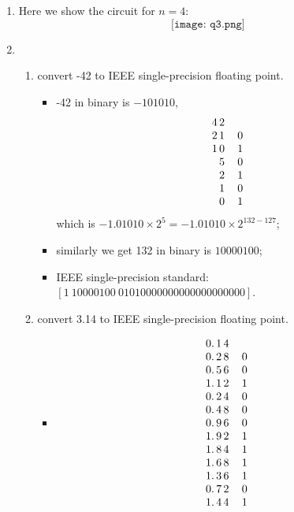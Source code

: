\documentclass[11pt,twoside]{article}
\begin{document}
\begin{enumerate}[leftmargin=0pt]
\item
Here we show the circuit for $n=4$:
		\[ \texttt{[image: q3.png]} \]
\item 
	\begin{enumerate}
	\item
		convert -42 to IEEE single-precision floating point.
		\begin{itemize}[label = {}]
		\item -42 in binary is $-101010$,
		\[\begin{tabular}{c@{\,}c@{\,}c@{\,}c}
  				& 4 &2  &  \\
			        & 2& 1&  \ \ \ 0\\
  				& 1 &0  & \ \ \ 1 \\
			        &    &  5&  \ \ \ 0\\
				&    &  2& \ \ \ 1 \\
				&    &  1& \ \ \ 0 \\
				&    &  0& \ \ \ 1 \\
		\end{tabular}\]
		 which is $-1.01010 \times 2^5 = -1.01010 \times 2^{132-127}$;
		\item similarly we get 132 in binary is $10000100$;
		\item IEEE single-precision standard: $[1 \ 10000100 \ 01010 00000 00000 00000 000]$.
		\end{itemize}
	\item 
		convert 3.14 to IEEE single-precision floating point.
		\begin{itemize}[label = {}]
		\item 
		\[\begin{tabular}{c@{\,}c@{\,}c@{\,}c}
  				0.&  1&4  &  \\
			        0.& 2& 8&  \ \ \ 0\\
  				0.& 5&6  & \ \ \ 0\\
				1.& 1&2  & \ \ \ 1 \\
				 0.& 2& 4&  \ \ \ 0\\
				  0.& 4& 8&  \ \ \ 0\\
				   0.& 9& 6&  \ \ \ 0\\
				  1.& 9& 2&  \ \ \ 1\\
				  1.& 8& 4&  \ \ \ 1\\
				  1.& 6& 8&  \ \ \ 1\\
				  1.&3& 6&  \ \ \ 1\\
				   0. &7& 2&  \ \ \ 0\\
				 1. &4& 4&  \ \ \ 1\\

\end{tabular}\]
\end{itemize}
\end{enumerate}
\end{enumerate}
\end{document}

